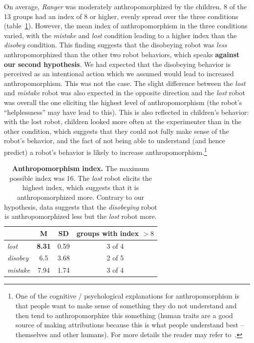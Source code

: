 \documentclass[letterpaper, 10pt, conference]{ieeeconf}
\begin{document}
On average, \emph{Ranger} was moderately anthropomorphized by the children. 8 of
the 13 groups had an index of 8 or higher, evenly spread over the three
conditions (table~\ref{tab:domino-anth-score}).  However, the mean index of
anthropomorphism in the three conditions varied, with the \textit{mistake} and
\textit{lost} condition leading to a higher index than the \textit{disobey}
condition. This finding suggests that the disobeying robot was \emph{less}
anthropomorphized than the other two robot behaviors, which speaks
\textbf{against our second hypothesis}. We had expected that the disobeying
behavior is perceived as an intentional action which we assumed would lead to
increased anthropomorphism. This was not the case. The slight difference between
the \textit{lost} and \textit{mistake} robot was also expected in the opposite
direction and the \textit{lost} robot was overall the one eliciting the highest
level of anthropomorphism (the robot's ``helplessness'' may have lead to this). This is
also reflected in children's behavior: with the lost robot, children looked more
often at the experimenter than in the other condition, which suggests that they
could not fully make sense of the robot's behavior, and the fact of not being
able to understand (and hence predict) a robot's behavior is likely to increase
anthropomorphism.\footnote{One of the cognitive / psychological explanations for
anthropomorphism is that people want to make sense of something they do not
understand and then tend to anthropomorphize this something (human traits
are a good source of making attributions because this is what people
understand best -- themselves and other humans). For more details the reader
may refer to~\cite{epley_seeing_2007}.}

\begin{table}[ht!] \centering \footnotesize \begin{tabular}{lccc} \toprule & M
& SD & groups with index $> 8$ \\ \midrule

        \textit{lost} & \textbf{8.31} & 0.59 & 3 of 4 \\ \textit{disobey} & 6.5
        & 3.68 & 2 of 5 \\ \textit{mistake} & 7.94 & 1.74 & 3 of 4 \\
        \bottomrule \end{tabular} \caption{\small \textbf{Anthropomorphism
        index.} The maximum possible index was 16. The \textit{lost} robot
        elicits the highest index, which suggests that it is anthropomorphized
        more. Contrary to our hypothesis, data suggests that the
        \textit{disobeying} robot is anthropomorphized less but the
        \textit{lost} robot more.}

    \label{tab:domino-anth-score}       %
\end{table}	
\end{document}
